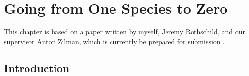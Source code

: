 \chapter{Going from One Species to Zero}%




This chapter is based on a paper written by myself, Jeremy Rothschild, and our supervisor Anton Zilman, which is currently be prepared for submission \cite{Badali2018a}. 

\section{Introduction} \label{Introduction}%


